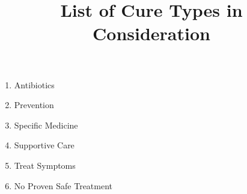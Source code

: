 \documentclass{article}
\title{List of Cure Types in Consideration}
\date{}
\begin{document}
\maketitle
\begin{enumerate}
    \item Antibiotics
    \item Prevention
    \item Specific Medicine
    \item Supportive Care
    \item Treat Symptoms
    \item No Proven Safe Treatment
  \end{enumerate}
\end{document}
